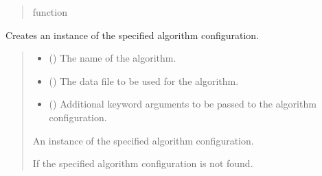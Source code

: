 \documentclass[letterpaper,10pt,english]{sphinxmanual}
\begin{document}
\begin{fulllineitems}
\begin{fulllineitems}
\begin{quote}
\begin{description}
\sphinxAtStartPar
function

\end{description}\end{quote}

\end{fulllineitems}


\begin{fulllineitems}
\label{\detokenize{modules:application.factories.AlgorithmFactory.AlgorithmFactory.create}}
\pysigstartsignatures
{}
\pysigstopsignatures
\sphinxAtStartPar
Creates an instance of the specified algorithm configuration.
\begin{quote}\begin{description}
\begin{itemize}
\item {} 
\sphinxAtStartPar
{} () \textendash{} The name of the algorithm.

\item {} 
\sphinxAtStartPar
{} () \textendash{} The data file to be used for the algorithm.

\item {} 
\sphinxAtStartPar
{} () \textendash{} Additional keyword arguments to be passed to the algorithm configuration.

\end{itemize}

\sphinxAtStartPar
An instance of the specified algorithm configuration.

\sphinxAtStartPar
{\hyperref[\detokenize{modules:domain.interfaces.AlgorithmConfigurator.AlgorithmConfigurator}]{}}

\sphinxAtStartPar
{\hyperref[\detokenize{modules:domain.exceptions.AlgorithmNotFound.AlgorithmDataNotFound}]{}} \textendash{} If the specified algorithm configuration is not found.

\end{description}\end{quote}

\end{fulllineitems}


\end{fulllineitems}
\end{document}
